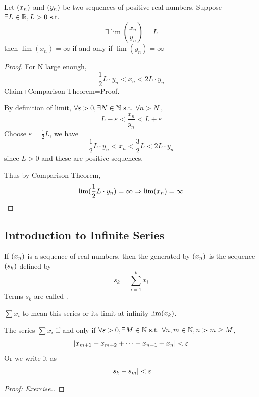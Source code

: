 \documentclass[a4paper,12pt]{article}
\begin{document}
\begin{theorem}
    Let \((x_{n})\) and \((y_{n})\) be two sequences of positive real numbers. Suppose \(\exists L\in\mathbb{R},L>0\text{ s.t. }\)
    \[\exists \lim(\frac{x_n }{y_n })=L\]
    then \(\lim(x_n)=\infty\) if and only if \(\lim(y_n)=\infty\)
\end{theorem}

\begin{proof}
     For N large enough, 
    \[\frac{1}{2}L\cdot y_n<x_n<2L\cdot y_n\]
     Claim+Comparison Theorem=Proof.

    By definition of limit, \(\forall \varepsilon>0, \exists N\in\mathbb{N} \text{ s.t. } \forall n>N\),
    \[L-\varepsilon<\frac{x_n }{y_n }<L+\varepsilon\]
    Choose \(\varepsilon=\frac{1}{2}L\), we have 
    \[\frac{1}{2}L\cdot y_n<x_n<\frac{3}{2}L<2L\cdot y_n\]
    since \(L>0\) and these are positive sequences.

    Thus by Comparison Theorem, 
    \[\lim(\frac{1}{2}L\cdot y_{n})=\infty\Rightarrow \lim(x _{n })=\infty\]
\end{proof}
\newpage

\subsection{Introduction to Infinite Series}

\begin{definition} 
    If \((x _{n })\) is a sequence of real numbers, then the  generated by \((x _{n })\) is the sequence \((s _{k })\) defined by 
    \[s_k=\sum_{i=1}^{k }x_i \]
    Terms \(s_k \) are called .\\
    \begin{notation}
        \(\sum x_i \) to mean this series or its limit at infinity \(\lim (x _{ k })\).\\
    \end{notation}
\end{definition}

\begin{theorem} 
    The series \(\sum x_i \)  if and only if \(\forall \varepsilon >0, \exists M\in\mathbb{N} \text{ s.t. } \forall n,m\in\mathbb{N}, n>m\ge M\),
    \[\left\lvert x_{m+1}+x_{m+2}+\dots+x_{n-1}+x_{n}\right\rvert<\varepsilon\]
    Or we write it as 
    \[\left\lvert s_k-s_m\right\rvert<\varepsilon\]
    \begin{proof}[\textit{Proof: Exercise.}]
    \end{proof}
\end{theorem}
\end{document}
